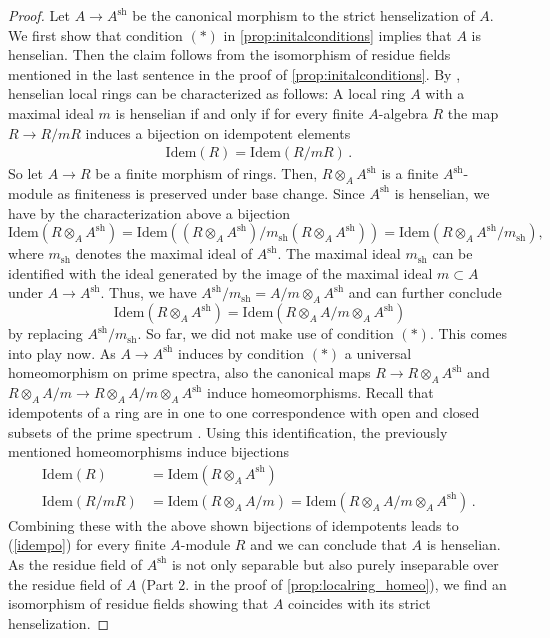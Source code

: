 \documentclass[leqno]{article}
\begin{document}
\begin{proof}
Let $A\rightarrow A^{\mathrm{sh}}$ be the canonical morphism to the strict henselization of $A$.
We first show that condition $(\ast)$ in \cref{prop:initalconditions} implies that $A$ is henselian. 
Then the claim follows from the isomorphism of residue fields mentioned in the last sentence in the proof of \cref{prop:initalconditions}.
By \cite[\href{https://stacks.math.columbia.edu/tag/09XI}{Lemma 09XI}]{stacksproject}, henselian local rings can be characterized as follows: 
A local ring $A$ with a maximal ideal $m$ is henselian if and only if for every finite $A$-algebra $R$ the map $R\rightarrow R/mR$ induces a bijection on idempotent elements
\begin{align}\label{idempo}
\mathrm{Idem}(R)=\mathrm{Idem}(R/mR)\period
\end{align}
So let $A\rightarrow R$ be a finite morphism of rings.
Then, $R\otimes_A A^{\mathrm{sh}}$ is a finite $A^{\mathrm{sh}}$-module as finiteness is preserved under base change.
Since $A^{\mathrm{sh}}$ is henselian, we have by the characterization above a bijection
$$\mathrm{Idem}(R\otimes_A A^{\mathrm{sh}})=\mathrm{Idem}((R\otimes_A A^{\mathrm{sh}})/m_{\mathrm{sh}}(R\otimes_A A^{\mathrm{sh}}))=\mathrm{Idem}(R\otimes_A A^{\mathrm{sh}}/m_{\mathrm{sh}})\comma$$ where $m_{\mathrm{sh}}$ denotes the maximal ideal of $A^{\mathrm{sh}}$.
The maximal ideal $m_{\mathrm{sh}}$ can be identified with the ideal generated by the image of the maximal ideal $m \subset A$ under $A\rightarrow A^{\mathrm{sh}}$.
Thus, we have $A^{\mathrm{sh}}/m_{\mathrm{sh}}=A/m\otimes_A A^{\mathrm{sh}}$ and can further conclude 
$$\mathrm{Idem}(R\otimes_A A^{\mathrm{sh}})=\mathrm{Idem}(R\otimes_A A/m\otimes_A A^{\mathrm{sh}})$$ by replacing $A^{\mathrm{sh}}/m_{\mathrm{sh}}$.
So far, we did not make use of condition $(\ast)$.
This comes into play now. 
As $A\rightarrow A^{\mathrm{sh}}$ induces by condition $(\ast)$ a universal homeomorphism on prime spectra, also the canonical maps $R\rightarrow R\otimes_A A^{\mathrm{sh}}$ and $R\otimes_A A/m \rightarrow R\otimes_A A/m \otimes_A A^{\mathrm{sh}}$ induce homeomorphisms.
Recall that idempotents of a ring are in one to one correspondence with open and closed subsets of the prime spectrum \cite[\href{https://stacks.math.columbia.edu/tag/00EE}{Lemma 00EE}]{stacksproject}.
Using this identification, the previously mentioned homeomorphisms induce bijections 
\begin{align*}
 \mathrm{Idem}(R)&=\mathrm{Idem}(R\otimes_A A^{\mathrm{sh}}) \\
 \mathrm{Idem}(R/mR)&=\mathrm{Idem}(R\otimes_A A/m)=\mathrm{Idem}(R\otimes_A A/m \otimes_A A^{\mathrm{sh}})\period
\end{align*}
Combining these with the above shown bijections of idempotents leads to (\ref{idempo}) for every finite $A$-module $R$ and we can conclude that $A$ is henselian.
As the residue field of $A^{\mathrm{sh}}$ is not only separable but also purely inseparable over the residue field of $A$ (Part $2.$ in the proof of \cref{prop:localring_homeo}), we find an isomorphism of residue fields showing that $A$ coincides with its strict henselization.
\end{proof}
\end{document}
